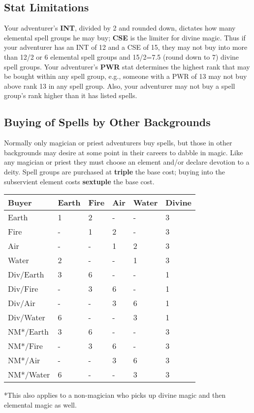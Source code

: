 \begin{multicols*}{2}
\subsection{Stat Limitations}
Your adventurer's \textbf{INT}, divided by 2 and rounded down, dictates how many elemental spell groups he may buy; \textbf{CSE} is the limiter for divine magic. Thus if your adventurer has an INT of 12 and a CSE of 15, they may not buy into more than 12/2 or 6 elemental spell groups and 15/2=7.5 (round down to 7) divine spell groups.
Your adventurer's \textbf{PWR} stat determines the highest rank that may be bought within any spell group, e.g., someone with a PWR of 13 may not buy above rank 13 in any spell group. Also, your adventurer may not buy a spell group's rank higher than it has listed spells.
\subsection{Buying of Spells by Other Backgrounds}
Normally only magician or priest adventurers buy spells, but those in other backgrounds may desire at some point in their careers to dabble in magic. Like any magician or priest they must choose an element and/or declare devotion to a deity. Spell groups are purchased at \textbf{triple} the base cost; buying into the subservient element costs \textbf{sextuple} the base cost.

\begin{normbox}
\begin{tabular}{l l l l l l}
\small
\textbf{Buyer} & \textbf{Earth}  & \textbf{Fire} & \textbf{Air} & \textbf{Water}  & \textbf{Divine}\\
\midrule
Earth & 1 & 2 & - & - & 3\\
Fire & - & 1 & 2 & - & 3\\
Air & - & - & 1 & 2 & 3\\
Water & 2 & - & - & 1 & 3\\
Div/Earth & 3 & 6 & - & - & 1\\
Div/Fire & - & 3 & 6 & - & 1\\
Div/Air & - & - & 3 & 6 & 1\\
Div/Water & 6 & - & - & 3 & 1\\
NM*/Earth & 3 & 6 & - & - & 3\\
NM*/Fire & - & 3 & 6 & - & 3\\
NM*/Air & - & - & 3 & 6 & 3\\
NM*/Water & 6 & - & - & 3 & 3\\
\end{tabular}
\end{normbox}
\normalsize
*This also applies to a non-magician who picks up divine magic and then elemental magic as well.


\end{multicols*}
